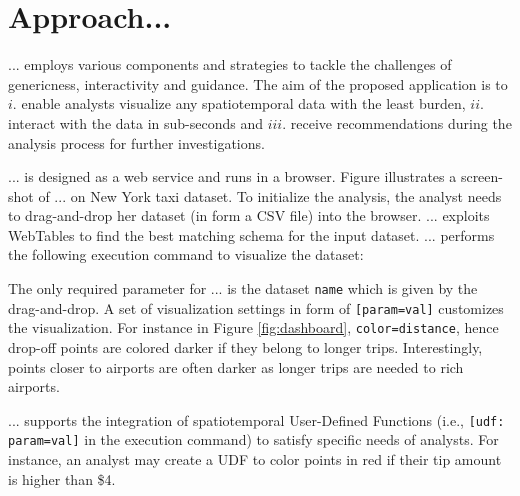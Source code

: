 \documentclass[runningheads,a4paper]{llncs}
\begin{document}


\vspace{-5pt}
\section{Approach...}
... employs various components and strategies to tackle the challenges of genericness, interactivity and guidance. The aim of the proposed application is to $i.$ enable analysts visualize any spatiotemporal data with the least burden, $ii.$ interact with the data in sub-seconds and $iii.$ receive recommendations during the analysis process for further investigations.

... is designed as a web service and runs in a browser. Figure illustrates a screen-shot of ... on New York taxi dataset. To initialize the analysis, the analyst needs to drag-and-drop her dataset (in form a CSV file) into the browser. ... exploits {\sc WebTables} \cite{cafarella2008webtables} to find the best matching schema for the input dataset. ... performs the following execution command to visualize the dataset:


The only required parameter for ... is the dataset {\tt \small name} which is given by the drag-and-drop. A set of visualization settings in form of {\tt \small [param=val]} customizes the visualization. 
For instance in Figure \ref{fig:dashboard}, {\tt \small color=distance}, hence drop-off points are colored darker if they belong to longer trips. Interestingly, points closer to airports are often darker as longer trips are needed to rich airports.

... supports the integration of spatiotemporal User-Defined Functions (i.e., {\tt \small [udf: param=val]} in the execution command) to satisfy specific needs of analysts. For instance, an analyst may create a UDF to color points in red if their tip amount is higher than \$4.
\end{document}
